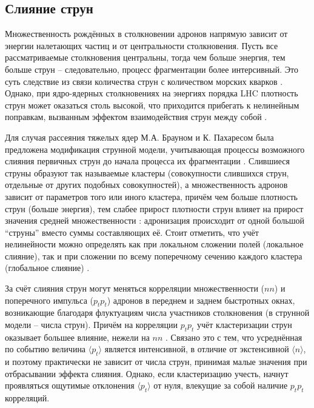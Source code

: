 \subsection{Слияние струн}
Множественность рождённых в столкновении адронов напрямую зависит от энергии налетающих частиц и от центральности столкновения. Пусть все рассматриваемые столкновения центральны, тогда чем больше энергия, тем больше струн -- следовательно, процесс фрагментации более интерсивный. Это суть следствие из связи количества струн с количеством морских кварков \cite{SeaQarkStrings}. Однако, при ядро-ядерных столкновениях на энергиях порядка LHC плотность струн может оказаться столь высокой, что приходится прибегать к нелинейным поправкам, вызванным эффектом взаимодействия струн между собой \cite{StringFusion}.

Для случая рассеяния тяжелых ядер М.А. Брауном и К. Пахаресом была предложена модификация струнной модели, учитывающая процессы возможного слияния первичных струн до начала процесса их фрагментации \cite{PreFusion1, PreFusion2, PreFusion3, PreFusion4}. Слившиеся струны образуют так называемые кластеры (совокупности слившихся струн, отдельные от других подобных совокупностей), а множественность адронов зависит от параметров того или иного кластера, причём чем больше плотность струн (больше энергия), тем слабее прирост плотности струн влияет на прирост значения средней множественности \cite{MulReduction}: адронизация происходит от одной большой ``струны'' вместо суммы составляющих её. Стоит отметить, что учёт нелинейности можно определять как при локальном сложении полей (локальное слияние), так и при сложении по всему поперечному сечению каждого кластера (глобальное слияние) \cite{MulReduction}.

За счёт слияния струн могут меняться корреляции множественности ($nn$) и поперечного импульса ($p_t p_t$) адронов в переднем и заднем быстротных окнах, возникающие благодаря флуктуациям числа участников столкновения (в струнной модели -- числа струн). Причём на корреляции $p_t p_t$ учёт кластеризации струн оказывает большее влияние, нежели на $nn$ \cite{MulReduction, PtPtCorr}. Связано это с тем, что усреднённая по событию величина $\langle p_t \rangle$ является интенсивной, в отличие от экстенсивной $\langle n \rangle$, и поэтому практически не зависит от числа струн, принимая малые значения при отбрасывании эффекта слияния. Однако, если кластеризацию учесть, начнут проявляться ощутимые отклонения $\langle p_t \rangle$ от нуля, влекущие за собой наличие $p_t p_t$ корреляций.
